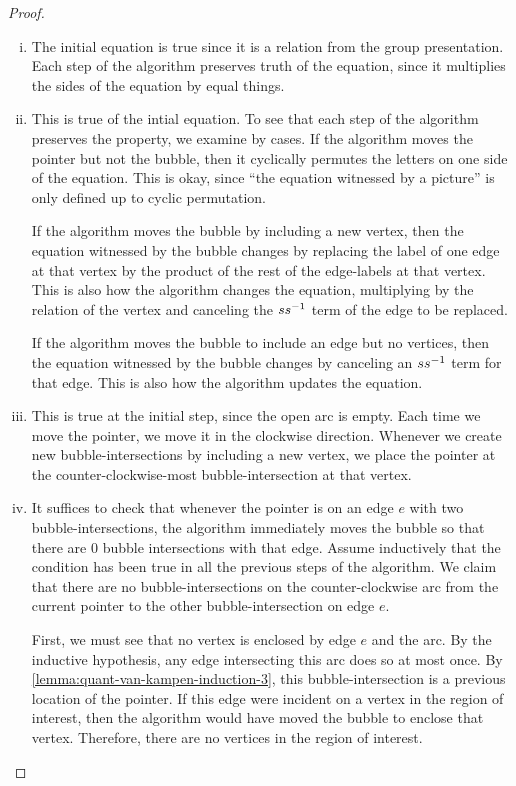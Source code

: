\begin{proof}
	\begin{enumerate}[(i)]
		\item The initial equation is true since it is a relation from the group presentation. Each step of the algorithm preserves truth of the equation, since it multiplies the sides of the equation by equal things.
		\item This is true of the intial equation. To see that each step of the algorithm preserves the property, we examine by cases. If the algorithm moves the pointer but not the bubble, then it cyclically permutes the letters on one side of the equation. This is okay, since ``the equation witnessed by a picture'' is only defined up to cyclic permutation.

		If the algorithm moves the bubble by including a new vertex, then the equation witnessed by the bubble changes by replacing the label of one edge at that vertex by the product of the rest of the edge-labels at that vertex.
		This is also how the algorithm changes the equation, multiplying by the relation of the vertex and canceling the $ss^{-1}$ term of the edge to be replaced.

		If the algorithm moves the bubble to include an edge but no vertices, then the equation witnessed by the bubble changes by canceling an $ss^{-1}$ term for that edge. This is also how the algorithm updates the equation.
		\item 
		This is true at the initial step, since the open arc is empty.
		Each time we move the pointer, we move it in the clockwise direction. Whenever we create new bubble-intersections by including a new vertex, we place the pointer at the counter-clockwise-most bubble-intersection at that vertex.
		\item 
		It suffices to check that whenever the pointer is on an edge $e$ with two bubble-intersections, the algorithm immediately moves the bubble so that there are $0$ bubble intersections with that edge.
		Assume inductively that the condition has been true in all the previous steps of the algorithm. We claim that there are no bubble-intersections on the counter-clockwise arc from the current pointer to the other bubble-intersection on edge $e$. 

		First, we must see that no vertex is enclosed by edge $e$ and the arc. 
		By the inductive hypothesis, any edge intersecting this arc does so at most once. By \eqref{lemma:quant-van-kampen-induction-3}, this bubble-intersection is a previous location of the pointer. If this edge were incident on a vertex in the region of interest, then the algorithm would have moved the bubble to enclose that vertex. Therefore, there are no vertices in the region of interest.


\end{enumerate}
\end{proof}
